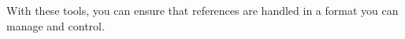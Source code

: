 With these tools, you can ensure that references are handled
in a format you can manage and control.\cite{flom2005latex}
